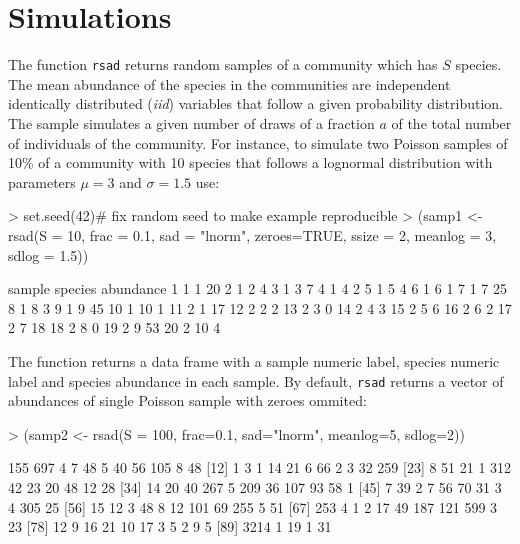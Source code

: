 \documentclass[11pt, A4]{article}
\newcommand{\code}[1]{\texttt{#1}}
\begin{document}
\section{Simulations}

The function \code{rsad} returns random samples of a community which
has $S$ species. The mean abundance of the species in the communities
are independent identically distributed (\emph{iid}) variables that
follow a given probability distribution. The sample simulates a given
number of draws of a fraction $a$ of the total number of individuals of
the community. For instance, to simulate two Poisson samples of 10\%
of a community with 10 species that follows a lognormal distribution
with parameters $\mu=3$ and $\sigma=1.5$ use:

\begin{Schunk}
\begin{Sinput}
> set.seed(42)# fix random seed to make example reproducible
> (samp1 <- rsad(S = 10, frac = 0.1, sad = "lnorm", zeroes=TRUE,
                ssize = 2, meanlog = 3, sdlog = 1.5))
\end{Sinput}
\begin{Soutput}
   sample species abundance
1       1       1        20
2       1       2         4
3       1       3         7
4       1       4         2
5       1       5         4
6       1       6         1
7       1       7        25
8       1       8         3
9       1       9        45
10      1      10         1
11      2       1        17
12      2       2         2
13      2       3         0
14      2       4         3
15      2       5         6
16      2       6         2
17      2       7        18
18      2       8         0
19      2       9        53
20      2      10         4
\end{Soutput}
\end{Schunk}

The function returns a data frame with a sample numeric label,
species numeric label and species abundance in each sample. By
default, \code{rsad} returns a vector of abundances of single Poisson
sample with zeroes ommited:

\begin{Schunk}
\begin{Sinput}
> (samp2 <- rsad(S = 100, frac=0.1, sad="lnorm", 
               meanlog=5, sdlog=2))
\end{Sinput}
\begin{Soutput}
 [1]  155  697    4    7   48    5   40   56  105    8   48
[12]    1    3    1   14   21    6   66    2    3   32  259
[23]    8   51   21    1  312   42   23   20   48   12   28
[34]   14   20   40  267    5  209   36  107   93   58    1
[45]    7   39    2    7   56   70   31    3    4  305   25
[56]   15   12    3   48    8   12  101   69  255    5   51
[67]  253    4    1    2   17   49  187  121  599    3   23
[78]   12    9   16   21   10   17    3    5    2    9    5
[89] 3214    1   19    1   31
\end{Soutput}
\end{Schunk}
\end{document}
